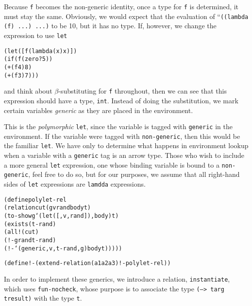 Because \texttt{f} becomes the non-generic identity, once a type for
\texttt{f} is determined, it must stay the same.  Obviously, we would
expect that the evaluation of ``\texttt{((lambda (f) ...) ...)}
to be 10, but it has no type.  If, however, we change the
expression to use \texttt{let}
\begin{alltt}
(let ([f (lambda (x) x)])
  (if (f (zero? 5))
    (+ (f 4) 8)
    (+ (f 3) 7)))
\end{alltt}

\noindent
and think about $\beta$-substituting for \texttt{f} throughout, then
we can see that this expression should have a type, \texttt{int}.
Instead of doing the substitution, we mark certain variables
\emph{generic} as they are placed in the environment. 

This is the \emph{polymorphic} \texttt{let}, since the variable is
tagged with \texttt{generic} in the environment.  If the variable were
tagged with \texttt{non-generic}, then this would be the familiar
\texttt{let}.  We have only to determine what happens in environment
lookup when a variable with a \texttt{generic} tag is an arrow type.
Those who wish to include a more general \texttt{let} expression, one
whose binding variable is bound to a \texttt{non-generic}, feel free
to do so, but for our purposes, we assume that all right-hand sides of
\texttt{let} expressions are \texttt{lamdda} expressions.

\begin{alltt}
(define polylet-rel
  (relation cut (g v rand body t)
    (to-show g `(let ([,v ,rand]) ,body) t)
    (exists (t-rand)
      (all! (cut)
        (!- g rand t-rand)
        (!- `(generic ,v ,t-rand ,g) body t)))))

(define !- (extend-relation (a1 a2 a3) !- polylet-rel))
\end{alltt}

In order to implement these generics, we introduce a relation,
\texttt{instantiate}, which uses \texttt{fun-nocheck}, whose purpose
is to associate the type \texttt{(--> targ tresult)} with the type
\texttt{t}.

